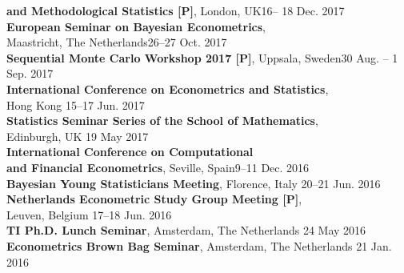 \documentclass[margin,line]{resume}
\begin{document}
\begin{resume}
	\textbf{and Methodological Statistics [P]}, London, UK\hfill 16-- 18 Dec. 2017 \vspace{1mm} \\ 	
	\textbf{ European Seminar on Bayesian Econometrics},\\
	 Maastricht, The Netherlands\hfill 26--27 Oct. 2017 \vspace{1mm} \\ 
	\textbf{Sequential Monte Carlo Workshop 2017 [P]}, Uppsala, Sweden\hfill 30 Aug. -- 1 Sep. 2017 \vspace{1mm} \\ 
	\textbf{ International Conference on Econometrics and Statistics},\\ Hong Kong \hfill 15--17 Jun. 2017 \vspace{1mm} \\    
    \textbf{Statistics Seminar Series of the School of Mathematics},\\ Edinburgh, UK \hfill 19 May 2017 \vspace{1mm} \\ 
    \textbf{ International Conference on Computational \\ and Financial Econometrics},  Seville, Spain\hfill 9--11 Dec. 2016  \vspace{1mm} \\ 
	\textbf{ Bayesian Young Statisticians Meeting}, Florence, Italy \hfill 20--21 Jun. 2016  \vspace{1mm} \\ 
	\textbf{ Netherlands Econometric Study Group Meeting [P]},\\
    Leuven, Belgium \hfill 17--18 Jun. 2016  \vspace{1mm} \\ 
    \textbf{TI Ph.D. Lunch Seminar}, Amsterdam, The Netherlands \hfill 24 May 2016  \vspace{1mm} \\ 
	\textbf{Econometrics Brown Bag Seminar}, Amsterdam, The Netherlands \hfill 21 Jan. 2016\\ 

\vspace{-3mm}


 

\end{resume}
\end{document}
